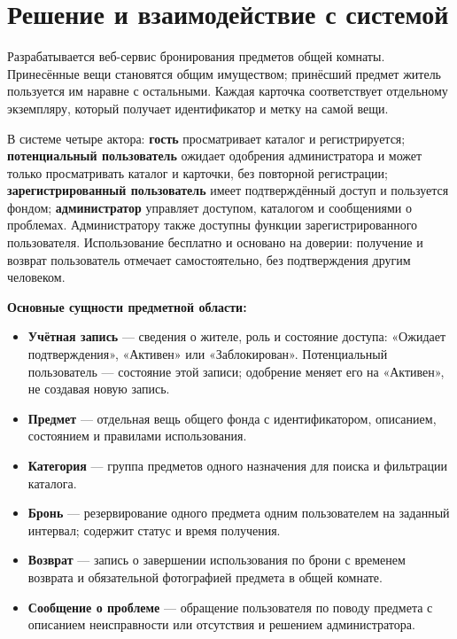 \documentclass[a4paper,12pt]{article}
\begin{document}
\section{Решение и взаимодействие с системой}
Разрабатывается веб-сервис бронирования предметов общей комнаты. Принесённые вещи становятся общим имуществом; принёсший предмет житель пользуется им наравне с остальными. Каждая карточка соответствует отдельному экземпляру, который получает идентификатор и метку на самой вещи.

В системе четыре актора: \textbf{гость} просматривает каталог и регистрируется; \textbf{потенциальный пользователь} ожидает одобрения администратора и может только просматривать каталог и карточки, без повторной регистрации; \textbf{зарегистрированный пользователь} имеет подтверждённый доступ и пользуется фондом; \textbf{администратор} управляет доступом, каталогом и сообщениями о проблемах. Администратору также доступны функции зарегистрированного пользователя. Использование бесплатно и основано на доверии: получение и возврат пользователь отмечает самостоятельно, без подтверждения другим человеком.

\par\noindent\textbf{Основные сущности предметной области:}
\begin{itemize}
\item \textbf{Учётная запись} --- сведения о жителе, роль и состояние доступа: «Ожидает подтверждения», «Активен» или «Заблокирован». Потенциальный пользователь --- состояние этой записи; одобрение меняет его на «Активен», не создавая новую запись.
\item \textbf{Предмет} --- отдельная вещь общего фонда с идентификатором, описанием, состоянием и правилами использования.
\item \textbf{Категория} --- группа предметов одного назначения для поиска и фильтрации каталога.
\item \textbf{Бронь} --- резервирование одного предмета одним пользователем на заданный интервал; содержит статус и время получения.
\item \textbf{Возврат} --- запись о завершении использования по брони с временем возврата и обязательной фотографией предмета в общей комнате.
\item \textbf{Сообщение о проблеме} --- обращение пользователя по поводу предмета с описанием неисправности или отсутствия и решением администратора.
\end{itemize}
\end{document}
